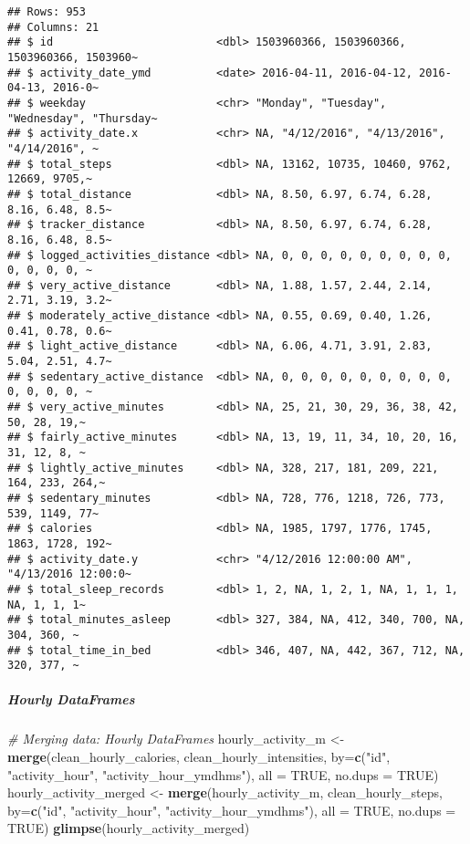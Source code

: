 \documentclass[
]{article}
\newenvironment{Shaded}{\begin{snugshade}}{\end{snugshade}}
\newcommand{\AttributeTok}[1]{\textcolor[rgb]{0.13,0.29,0.53}{#1}}
\newcommand{\CommentTok}[1]{\textcolor[rgb]{0.56,0.35,0.01}{\textit{#1}}}
\newcommand{\ConstantTok}[1]{\textcolor[rgb]{0.56,0.35,0.01}{#1}}
\newcommand{\FunctionTok}[1]{\textcolor[rgb]{0.13,0.29,0.53}{\textbf{#1}}}
\newcommand{\NormalTok}[1]{#1}
\newcommand{\OtherTok}[1]{\textcolor[rgb]{0.56,0.35,0.01}{#1}}
\newcommand{\StringTok}[1]{\textcolor[rgb]{0.31,0.60,0.02}{#1}}
\begin{document}
\begin{verbatim}
## Rows: 953
## Columns: 21
## $ id                         <dbl> 1503960366, 1503960366, 1503960366, 1503960~
## $ activity_date_ymd          <date> 2016-04-11, 2016-04-12, 2016-04-13, 2016-0~
## $ weekday                    <chr> "Monday", "Tuesday", "Wednesday", "Thursday~
## $ activity_date.x            <chr> NA, "4/12/2016", "4/13/2016", "4/14/2016", ~
## $ total_steps                <dbl> NA, 13162, 10735, 10460, 9762, 12669, 9705,~
## $ total_distance             <dbl> NA, 8.50, 6.97, 6.74, 6.28, 8.16, 6.48, 8.5~
## $ tracker_distance           <dbl> NA, 8.50, 6.97, 6.74, 6.28, 8.16, 6.48, 8.5~
## $ logged_activities_distance <dbl> NA, 0, 0, 0, 0, 0, 0, 0, 0, 0, 0, 0, 0, 0, ~
## $ very_active_distance       <dbl> NA, 1.88, 1.57, 2.44, 2.14, 2.71, 3.19, 3.2~
## $ moderately_active_distance <dbl> NA, 0.55, 0.69, 0.40, 1.26, 0.41, 0.78, 0.6~
## $ light_active_distance      <dbl> NA, 6.06, 4.71, 3.91, 2.83, 5.04, 2.51, 4.7~
## $ sedentary_active_distance  <dbl> NA, 0, 0, 0, 0, 0, 0, 0, 0, 0, 0, 0, 0, 0, ~
## $ very_active_minutes        <dbl> NA, 25, 21, 30, 29, 36, 38, 42, 50, 28, 19,~
## $ fairly_active_minutes      <dbl> NA, 13, 19, 11, 34, 10, 20, 16, 31, 12, 8, ~
## $ lightly_active_minutes     <dbl> NA, 328, 217, 181, 209, 221, 164, 233, 264,~
## $ sedentary_minutes          <dbl> NA, 728, 776, 1218, 726, 773, 539, 1149, 77~
## $ calories                   <dbl> NA, 1985, 1797, 1776, 1745, 1863, 1728, 192~
## $ activity_date.y            <chr> "4/12/2016 12:00:00 AM", "4/13/2016 12:00:0~
## $ total_sleep_records        <dbl> 1, 2, NA, 1, 2, 1, NA, 1, 1, 1, NA, 1, 1, 1~
## $ total_minutes_asleep       <dbl> 327, 384, NA, 412, 340, 700, NA, 304, 360, ~
## $ total_time_in_bed          <dbl> 346, 407, NA, 442, 367, 712, NA, 320, 377, ~
\end{verbatim}

\hypertarget{hourly-dataframes-7}{%
\subparagraph{Hourly DataFrames}\label{hourly-dataframes-7}}

\begin{Shaded}
\begin{Highlighting}[]
\CommentTok{\# Merging data: Hourly DataFrames}
\NormalTok{hourly\_activity\_m }\OtherTok{\textless{}{-}} \FunctionTok{merge}\NormalTok{(clean\_hourly\_calories, clean\_hourly\_intensities, }\AttributeTok{by=}\FunctionTok{c}\NormalTok{(}\StringTok{"id"}\NormalTok{, }\StringTok{"activity\_hour"}\NormalTok{, }\StringTok{"activity\_hour\_ymdhms"}\NormalTok{), }\AttributeTok{all =} \ConstantTok{TRUE}\NormalTok{, }\AttributeTok{no.dups =} \ConstantTok{TRUE}\NormalTok{)}
\NormalTok{hourly\_activity\_merged }\OtherTok{\textless{}{-}} \FunctionTok{merge}\NormalTok{(hourly\_activity\_m, clean\_hourly\_steps, }\AttributeTok{by=}\FunctionTok{c}\NormalTok{(}\StringTok{"id"}\NormalTok{, }\StringTok{"activity\_hour"}\NormalTok{, }\StringTok{"activity\_hour\_ymdhms"}\NormalTok{), }\AttributeTok{all =} \ConstantTok{TRUE}\NormalTok{, }\AttributeTok{no.dups =} \ConstantTok{TRUE}\NormalTok{)}
\FunctionTok{glimpse}\NormalTok{(hourly\_activity\_merged)}
\end{Highlighting}
\end{Shaded}
\end{document}
